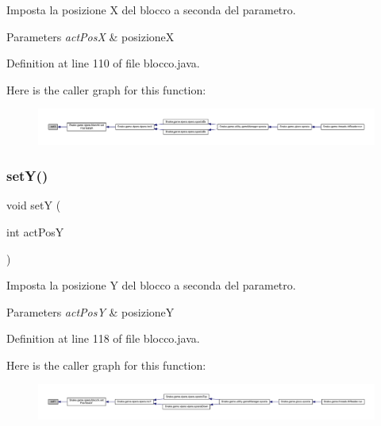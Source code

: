Imposta la posizione X del blocco a seconda del parametro. 


\begin{DoxyParams}{Parameters}
{\em act\+PosX} & posizioneX \\
\hline
\end{DoxyParams}


Definition at line 110 of file blocco.\+java.

Here is the caller graph for this function\+:
\nopagebreak
\begin{figure}[H]
\begin{center}
\leavevmode
\includegraphics[width=350pt]{class_snake_1_1game_1_1vipera_1_1blocco_ab5a3acb0391238ee37a5da898bffd5f1_icgraph}
\end{center}
\end{figure}
\mbox{\label{class_snake_1_1game_1_1vipera_1_1blocco_a60e970e880a18799c14e771afe3e904b}} 
\subsubsection{\texorpdfstring{set\+Y()}{setY()}}
{\footnotesize\ttfamily void setY (\begin{DoxyParamCaption}\item[{int}]{act\+PosY }\end{DoxyParamCaption})}



Imposta la posizione Y del blocco a seconda del parametro. 


\begin{DoxyParams}{Parameters}
{\em act\+PosY} & posizioneY \\
\hline
\end{DoxyParams}


Definition at line 118 of file blocco.\+java.

Here is the caller graph for this function\+:
\nopagebreak
\begin{figure}[H]
\begin{center}
\leavevmode
\includegraphics[width=350pt]{class_snake_1_1game_1_1vipera_1_1blocco_a60e970e880a18799c14e771afe3e904b_icgraph}
\end{center}
\end{figure}


